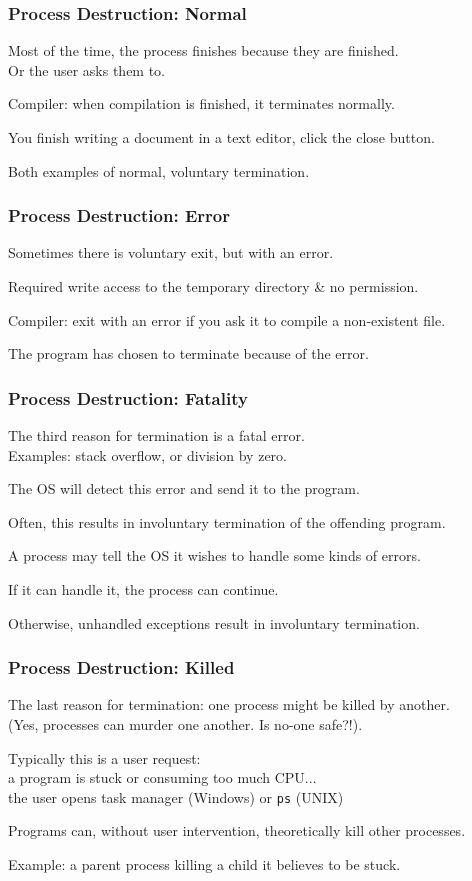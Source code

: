 \begin{frame}
\frametitle{Process Destruction: Normal}

Most of the time, the process finishes because they are finished.\\
\quad Or the user asks them to. 

Compiler: when compilation is finished, it terminates normally. 

You finish writing a document in a text editor, click the close button.

Both examples of normal, voluntary termination.

\end{frame}

\begin{frame}
\frametitle{Process Destruction: Error}

Sometimes there is voluntary exit, but with an error. 

Required write access to the temporary directory \& no permission.

Compiler: exit with an error if you ask it to compile a non-existent file.

The program has chosen to terminate because of the error.

\end{frame}

\begin{frame}
\frametitle{Process Destruction: Fatality}

The third reason for termination is a fatal error.\\
\quad Examples: stack overflow, or division by zero. 

The OS will detect this error and send it to the program. 

Often, this results in involuntary termination of the offending program. 

A process may tell the OS it wishes to handle some kinds of errors.

If it can handle it, the process can continue.

Otherwise, unhandled exceptions result in involuntary termination.

\end{frame}

\begin{frame}
\frametitle{Process Destruction: Killed}

The last reason for termination: one process might be killed by another.\\
\quad (Yes, processes can murder one another. Is no-one safe?!). 

Typically this is a user request:\\
\quad a program is stuck or consuming too much CPU...\\
\quad the user opens task manager (Windows) or \texttt{ps} (UNIX)

Programs can, without user intervention, theoretically kill other processes. 

Example: a parent process killing a child it believes to be stuck.

\end{frame}

